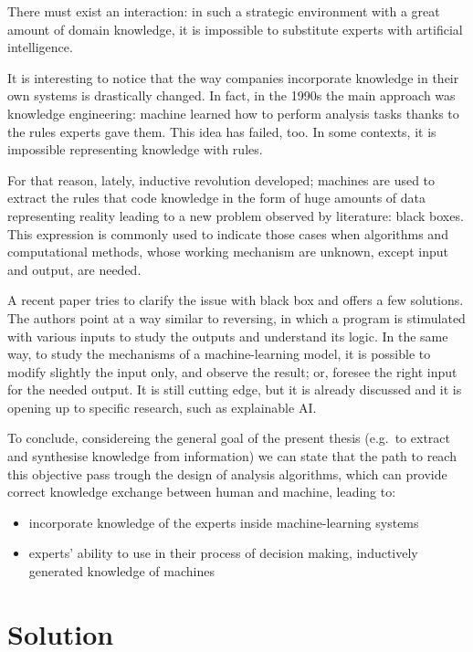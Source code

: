 \documentclass[]{book}
\theoremstyle{definition}
\theoremstyle{definition}
\theoremstyle{definition}
\theoremstyle{remark}
\begin{document}
There must exist an interaction: in such a strategic environment with a
great amount of domain knowledge, it is impossible to substitute experts
with artificial intelligence.

It is interesting to notice that the way companies incorporate knowledge
in their own systems is drastically changed. In fact, in the 1990s the
main approach was knowledge engineering: machine learned how to perform
analysis tasks thanks to the rules experts gave them. This idea has
failed, too. In some contexts, it is impossible representing knowledge
with rules.

For that reason, lately, inductive revolution developed; machines are
used to extract the rules that code knowledge in the form of huge
amounts of data representing reality leading to a new problem observed
by literature: black boxes. This expression is commonly used to indicate
those cases when algorithms and computational methods, whose working
mechanism are unknown, except input and output, are needed.

A recent paper \citep{pedreschi2018open} tries to clarify the issue with
black box and offers a few solutions. The authors point at a way similar
to reversing, in which a program is stimulated with various inputs to
study the outputs and understand its logic. In the same way, to study
the mechanisms of a machine-learning model, it is possible to modify
slightly the input only, and observe the result; or, foresee the right
input for the needed output. It is still cutting edge, but it is already
discussed and it is opening up to specific research, such as explainable
AI.

To conclude, considereing the general goal of the present thesis
(e.g.~to extract and synthesise knowledge from information) we can state
that the path to reach this objective pass trough the design of analysis
algorithms, which can provide correct knowledge exchange between human
and machine, leading to:

\begin{itemize}
\item
  incorporate knowledge of the experts inside machine-learning systems
\item
  experts' ability to use in their process of decision making,
  inductively generated knowledge of machines
\end{itemize}

\chapter*{Solution}\label{solution}
\end{document}
